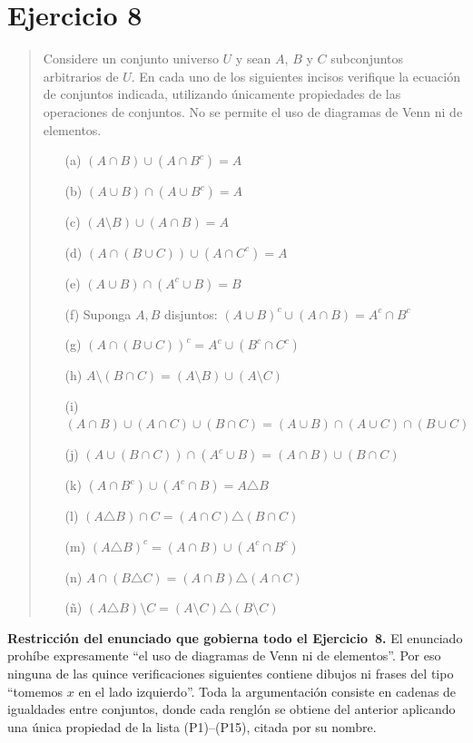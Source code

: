 \documentclass[11pt]{article}
\begin{document}
\section*{Ejercicio 8}

\begin{quote}
Considere un conjunto universo $U$ y sean $A$, $B$ y $C$ subconjuntos arbitrarios de $U$. En
cada uno de los siguientes incisos verifique la ecuación de conjuntos indicada, utilizando
únicamente propiedades de las operaciones de conjuntos. No se permite el uso de diagramas de
Venn ni de elementos.

\begin{enumerate}[leftmargin=*,itemsep=1pt]
	\item[(a)] $(A\cap B)\cup(A\cap B^{c})=A$
	\item[(b)] $(A\cup B)\cap(A\cup B^{c})=A$
	\item[(c)] $(A\setminus B)\cup(A\cap B)=A$
	\item[(d)] $(A\cap(B\cup C))\cup(A\cap C^{c})=A$
	\item[(e)] $(A\cup B)\cap(A^{c}\cup B)=B$
	\item[(f)] Suponga $A,B$ disjuntos: $(A\cup B)^{c}\cup(A\cap B)=A^{c}\cap B^{c}$
	\item[(g)] $(A\cap(B\cup C))^{c}=A^{c}\cup(B^{c}\cap C^{c})$
	\item[(h)] $A\setminus(B\cap C)=(A\setminus B)\cup(A\setminus C)$
	\item[(i)] $(A\cap B)\cup(A\cap C)\cup(B\cap C)=(A\cup B)\cap(A\cup C)\cap(B\cup C)$
	\item[(j)] $(A\cup(B\cap C))\cap(A^{c}\cup B)=(A\cap B)\cup(B\cap C)$
	\item[(k)] $(A\cap B^{c})\cup(A^{c}\cap B)=A\triangle B$
	\item[(l)] $(A\triangle B)\cap C=(A\cap C)\triangle(B\cap C)$
	\item[(m)] $(A\triangle B)^{c}=(A\cap B)\cup(A^{c}\cap B^{c})$
	\item[(n)] $A\cap(B\triangle C)=(A\cap B)\triangle(A\cap C)$
	\item[(ñ)] $(A\triangle B)\setminus C=(A\setminus C)\triangle(B\setminus C)$
\end{enumerate}
\end{quote}

\begin{nota}
\textbf{Restricción del enunciado que gobierna todo el Ejercicio~8.}
El enunciado prohíbe expresamente ``el uso de diagramas de Venn ni de elementos''. Por eso
ninguna de las quince verificaciones siguientes contiene dibujos ni frases del tipo ``tomemos
$x$ en el lado izquierdo''. Toda la argumentación consiste en cadenas de igualdades entre
conjuntos, donde cada renglón se obtiene del anterior aplicando una única propiedad de la lista
(P1)--(P15), citada por su nombre.
\end{nota}
\end{document}
